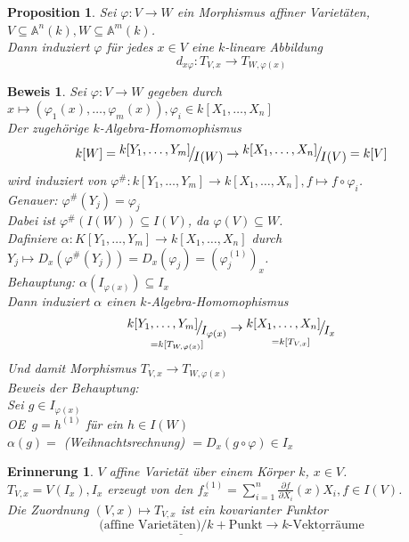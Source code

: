 \documentclass[a4paper,12pt]{report}
\theoremstyle{break}
\newtheorem{Prop}[Def]{Proposition}
\theoremstyle{nonumberbreak}
\newtheorem{nnErinn}{Erinnerung}
\newtheorem{Bew}{Beweis}
\theoremstyle{nonumberplain}
\newcommand{\Sum}{\sum\limits}
\newcommand{\A}{\mathbb{A}}
\newcommand{\FakRaum}[2]{
  \raisebox{0.7ex}{\ensuremath{#1}}
  \ensuremath{\mkern-3mu}\big/\ensuremath{\mkern-3mu}
  \raisebox{-0.6ex}{\ensuremath{#2}}}
\renewcommand{\OE}{O\!\!E~}
\begin{document}
\begin{Prop}
Sei $\varphi:V\to W$ ein Morphismus affiner Variet\"aten, $V\subseteq \A^n(k), W\subseteq \A^m(k)$.\\
Dann induziert $\varphi$ f\"ur jedes $x\in V$ eine $k$-lineare Abbildung
	\[ d_{x\varphi}: T_{V,x}\to T_{W,\varphi(x)} \]
\end{Prop}

\begin{Bew}
Sei $\varphi:V\to W$ gegeben durch $x\mapsto(\varphi_1(x),\ldots ,\varphi_m(x)), \varphi_i\in k[X_1,\ldots ,X_n]$\\
Der zugeh\"orige $k$-Algebra-Homomophismus
	\[k[W]=\FakRaum{k[Y_1,\ldots ,Y_m]}{I(W)}\to \FakRaum{k[X_1,\ldots ,X_n]}{I(V)}=k[V]\]
wird induziert von $\varphi^\#:k[Y_1,\ldots ,Y_m]\to k[X_1,\ldots ,X_n], f\mapsto f\circ \varphi_i$.\\
Genauer: $\varphi^\#(Y_j)=\varphi_j$\\
Dabei ist $\varphi^\#(I(W))\subseteq I(V)$, da $\varphi(V)\subseteq W$.\\
Dafiniere $\alpha: K[Y_1,\ldots ,Y_m]\to k[X_1,\ldots ,X_n]$ durch $Y_j\mapsto D_x(\varphi^\#(Y_j))=D_x(\varphi_j)=(\varphi_j^{(1)})_x$.\\
\emph{Behauptung:} $\alpha(I_{\varphi(x)})\subseteq I_x$\\
Dann induziert $\alpha$ einen $k$-Algebra-Homomophismus
	\[ \underset{=k[T_{W,\varphi(x)}]}{\FakRaum{k[Y_1,\ldots ,Y_m]}{I_{\varphi(x)}}} \to \underset{=k[T_{V,x}]}{\FakRaum{k[X_1,\ldots ,X_n]}{I_x}} \]
Und damit Morphismus $T_{V,x}\to T_{W,\varphi(x)}$\\
\emph{Beweis der Behauptung:}\\
Sei $g\in I_{\varphi(x)}$\\
\OE $g=h^{(1)}$ f\"ur ein $h\in I(W)$\\
$\alpha(g) =$ (Weihnachtsrechnung) $= D_x(g\circ \varphi)\in I_x$
\end{Bew}

\begin{nnErinn}
$V$ affine Variet\"at \"uber einem K\"orper $k$, $x\in V$.\\
$T_{V,x} =V(I_x), I_x$ erzeugt von den $f_x^{(1)}=\Sum_{i=1}^n\frac{\partial f}{\partial X_i}(x)X_i, f\in I(V)$.\\
Die Zuordnung $(V,x)\mapsto T_{V,x}$ ist ein kovarianter Funktor
	\[ \underline{\text{(affine Variet\"aten)}/k + \text{Punkt}} \to \underline{k\text{-Vektorr\"aume}}\]
\end{nnErinn}
\end{document}
